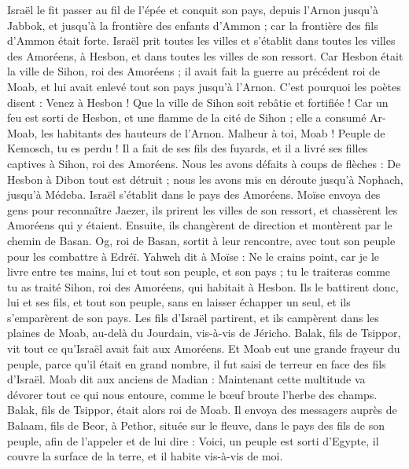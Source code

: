 \begin{multicols}{2}
Israël le fit passer au fil de l'épée et conquit son pays, depuis l’Arnon jusqu'à Jabbok, et jusqu'à la frontière des enfants d’Ammon ; car la frontière des fils d’Ammon était forte.
Israël prit toutes les villes et s’établit dans toutes les villes des Amoréens, à Hesbon, et dans toutes les villes de son ressort.
Car Hesbon était la ville de Sihon, roi des Amoréens ; il avait fait la guerre au précédent roi de Moab, et lui avait enlevé tout son pays jusqu'à l’Arnon.
C'est pourquoi les poètes disent : Venez à Hesbon ! Que la ville de Sihon soit rebâtie et fortifiée !
Car un feu est sorti de Hesbon, et une flamme de la cité de Sihon ; elle a consumé Ar-Moab, les habitants des hauteurs de l’Arnon.
Malheur à toi, Moab ! Peuple de Kemosch, tu es perdu ! Il a fait de ses fils des fuyards, et il a livré ses filles captives à Sihon, roi des Amoréens.
Nous les avons défaits à coups de flèches : De Hesbon à Dibon tout est détruit ; nous les avons mis en déroute jusqu'à Nophach, jusqu'à Médeba.
Israël s’établit dans le pays des Amoréens.
Moïse envoya des gens pour reconnaître Jaezer, ils prirent les villes de son ressort, et chassèrent les Amoréens qui y étaient.
Ensuite, ils changèrent de direction et montèrent par le chemin de Basan. Og, roi de Basan, sortit à leur rencontre, avec tout son peuple pour les combattre à Edréï.
Yahweh dit à Moïse : Ne le crains point, car je le livre entre tes mains, lui et tout son peuple, et son pays ; tu le traiteras comme tu as traité Sihon, roi des Amoréens, qui habitait à Hesbon.
Ils le battirent donc, lui et ses fils, et tout son peuple, sans en laisser échapper un seul, et ils s’emparèrent de son pays.
\VerseOne{}Les fils d'Israël partirent, et ils campèrent dans les plaines de Moab, au-delà du Jourdain, vis-à-vis de Jéricho.
Balak, fils de Tsippor, vit tout ce qu'Israël avait fait aux Amoréens.
Et Moab eut une grande frayeur du peuple, parce qu'il était en grand nombre, il fut saisi de terreur en face des fils d'Israël.
Moab dit aux anciens de Madian : Maintenant cette multitude va dévorer tout ce qui nous entoure, comme le bœuf broute l'herbe des champs. Balak, fils de Tsippor, était alors roi de Moab.
Il envoya des messagers auprès de Balaam, fils de Beor, à Pethor, située sur le fleuve, dans le pays des fils de son peuple, afin de l'appeler et de lui dire : Voici, un peuple est sorti d'Egypte, il couvre la surface de la terre, et il habite vis-à-vis de moi.

\end{multicols}
